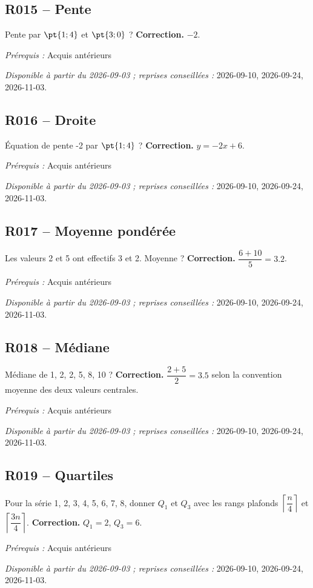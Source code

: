\subsection*{R015 -- Pente}\label{R015}
Pente par $\pt{1;4}$ et $\pt{3;0}$ ?
\ifmxteacher\textbf{Correction.} $-2$.\par\textit{Prérequis :} Acquis antérieurs\par\textit{Disponible à partir du 2026-09-03 ; reprises conseillées :} 2026-09-10, 2026-09-24, 2026-11-03.\fi
{}\subsection*{R016 -- Droite}\label{R016}
Équation de pente -2 par $\pt{1;4}$ ?
\ifmxteacher\textbf{Correction.} $y=-2x+6$.\par\textit{Prérequis :} Acquis antérieurs\par\textit{Disponible à partir du 2026-09-03 ; reprises conseillées :} 2026-09-10, 2026-09-24, 2026-11-03.\fi
{}\subsection*{R017 -- Moyenne pondérée}\label{R017}
Les valeurs 2 et 5 ont effectifs 3 et 2. Moyenne ?
\ifmxteacher\textbf{Correction.} $\dfrac{6+10}{5}=\num{3,2}$.\par\textit{Prérequis :} Acquis antérieurs\par\textit{Disponible à partir du 2026-09-03 ; reprises conseillées :} 2026-09-10, 2026-09-24, 2026-11-03.\fi
{}\subsection*{R018 -- Médiane}\label{R018}
Médiane de 1, 2, 2, 5, 8, 10 ?
\ifmxteacher\textbf{Correction.} $\dfrac{2+5}{2}=\num{3,5}$ selon la convention moyenne des deux valeurs centrales.\par\textit{Prérequis :} Acquis antérieurs\par\textit{Disponible à partir du 2026-09-03 ; reprises conseillées :} 2026-09-10, 2026-09-24, 2026-11-03.\fi
{}\subsection*{R019 -- Quartiles}\label{R019}
Pour la série 1, 2, 3, 4, 5, 6, 7, 8, donner $Q_1$ et $Q_3$ avec les rangs plafonds $\left\lceil\dfrac n4\right\rceil$ et $\left\lceil\dfrac{3n}4\right\rceil$.
\ifmxteacher\textbf{Correction.} $Q_1=2$, $Q_3=6$.\par\textit{Prérequis :} Acquis antérieurs\par\textit{Disponible à partir du 2026-09-03 ; reprises conseillées :} 2026-09-10, 2026-09-24, 2026-11-03.\fi
